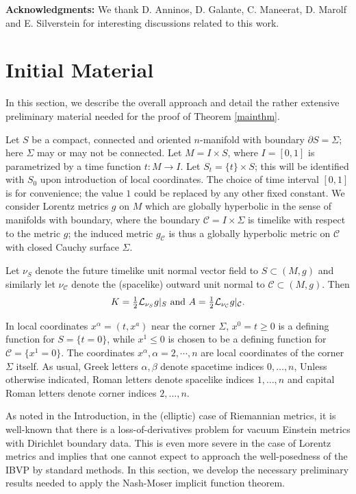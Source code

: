\documentclass[10pt]{amsart}
\renewcommand{\a}{\alpha}
\renewcommand{\b}{\beta}
\newcommand{\Si}{\Sigma}
\newcommand{\cC}{{\mathcal C}}
\newcommand{\cL}{{\mathcal L}}
\newcommand{\p}{\partial}
\renewcommand{\to}{\rightarrow}
\newcommand{\<}{\langle}
\renewcommand{\>}{\rangle}
\theoremstyle{plain}
\theoremstyle{remark}
\theoremstyle{definition}
\numberwithin{equation}{section}
\begin{document}
\medskip 
 
{\bf Acknowledgments:} We thank D. Anninos, D. Galante, C. Maneerat, D. Marolf and E. Silverstein for interesting discussions related to this work. 



\section{Initial Material}

  In this section, we describe the overall approach and detail the rather extensive preliminary material needed for the proof of Theorem \ref{mainthm}. 
  
  Let $S$ be a compact, connected and oriented $n$-manifold with boundary $\p S = \Si$; here $\Si$ may or may not be connected. Let $M = I\times S$, 
where $I = [0,1]$ is parametrized by a  time function $t: M \to I$. Let $S_t = \{t\}\times S$; this will be identified with $S_0$ upon introduction of local coordinates. 
The choice of time interval $[0,1]$ is for convenience; the value $1$ could be replaced by any other fixed constant. We consider Lorentz metrics $g$ on $M$ 
which are globally hyperbolic in the sense of manifolds with boundary, where the boundary $\cC = I\times \Si$ is timelike with respect to the metric $g$; the 
induced metric $g_{\cC}$ is thus a globally hyperbolic metric on $\cC$ with closed Cauchy surface $\Si$. 
 
   Let $\nu_S$ denote the future timelike unit normal vector field to $S \subset (M, g)$ and similarly let $\nu_{\cC}$ denote the (spacelike) 
 outward unit normal to $\cC \subset (M, g)$. Then 
 $$K = \tfrac{1}{2}\cL_{\nu_S}g |_S \ {\rm and} \  A = \tfrac{1}{2}\cL_{\nu_{\cC}}g |_{\cC}.$$

   In local coordinates $x^{\a} = (t, x^a)$ near the corner $\Si$, $x^0 = t \geq 0$ is a defining function for $S = \{t = 0\}$, while $x^1 \leq 0$ is chosen 
to be a defining function for $\cC = \{x^1 = 0\}$. The coordinates $x^{\a}, \a = 2, \cdots, n$ are local coordinates of the corner $\Si$ itself. 
As usual, Greek letters $\a, \b$ denote spacetime indices $0, \dots, n$, Unless otherwise indicated, Roman letters denote spacelike indices $1, \dots, n$ 
and capital Roman letters denote corner indices $2, \dots, n$. 

\medskip 
  
  As noted in the Introduction, in the (elliptic) case of Riemannian metrics, it is well-known that there is a loss-of-derivatives problem for vacuum 
Einstein metrics with Dirichlet boundary data. This is even more severe in the case of Lorentz metrics and implies that one cannot expect to 
approach the well-posedness of the IBVP by standard methods. In this section, we develop the necessary preliminary results needed to apply 
the Nash-Moser implicit function theorem. 
\end{document}
